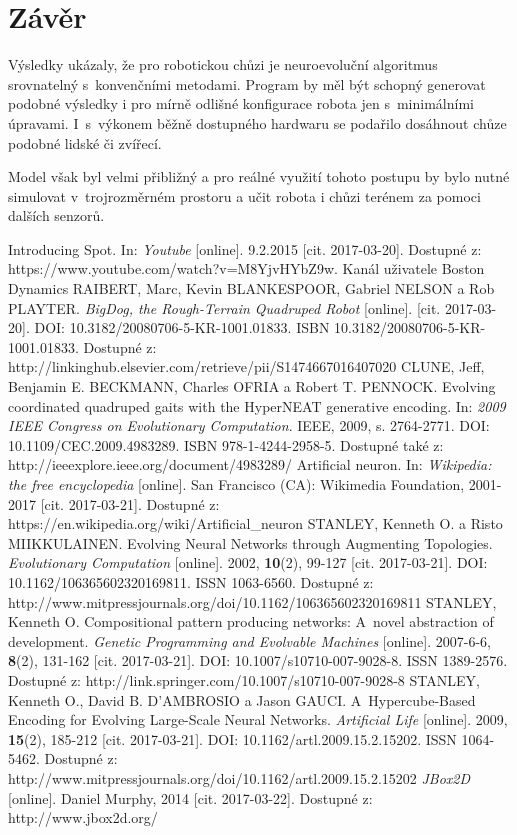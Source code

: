 \documentclass[a4]{article}
\begin{document}
\section{Závěr} 
Výsledky ukázaly, že pro robotickou chůzi je neuroevoluční algoritmus srovnatelný s~konvenčními metodami. Program by měl být schopný generovat podobné výsledky i pro mírně odlišné konfigurace robota jen s~minimálními úpravami. I~s~výkonem běžně dostupného hardwaru se podařilo dosáhnout chůze podobné lidské či zvířecí. \par Model však byl velmi přibližný a pro reálné využití tohoto postupu by bylo nutné simulovat v~trojrozměrném prostoru a učit robota i chůzi terénem za pomoci dalších senzorů.
\begin{thebibliography}{8}
Introducing Spot. In: \textit{Youtube} [online]. 9.2.2015 [cit. 2017-03-20]. Dostupné z: https://www.youtube.com/watch?v=M8YjvHYbZ9w. Kanál uživatele Boston Dynamics
RAIBERT, Marc, Kevin BLANKESPOOR, Gabriel NELSON a Rob PLAYTER. \textit{BigDog, the Rough-Terrain Quadruped Robot} [online]. [cit. 2017-03-20]. DOI: 10.3182/20080706-5-KR-1001.01833. ISBN 10.3182/20080706-5-KR-1001.01833. Dostupné z: http://linkinghub.elsevier.com/retrieve/pii/S1474667016407020
CLUNE, Jeff, Benjamin E. BECKMANN, Charles OFRIA a Robert T. PENNOCK. Evolving coordinated quadruped gaits with the HyperNEAT generative encoding. In: \textit{2009 IEEE Congress on Evolutionary Computation}. IEEE, 2009, s. 2764-2771. DOI: 10.1109/CEC.2009.4983289. ISBN 978-1-4244-2958-5. Dostupné také z: http://ieeexplore.ieee.org/document/4983289/
Artificial neuron. In: \textit{Wikipedia: the free encyclopedia} [online]. San Francisco (CA): Wikimedia Foundation, 2001-2017 [cit. 2017-03-21]. Dostupné z: https://en.wikipedia.org/wiki/Artificial\_neuron
STANLEY, Kenneth O. a Risto MIIKKULAINEN. Evolving Neural Networks through Augmenting Topologies. \emph{Evolutionary Computation} [online]. 2002, \textbf{10}(2), 99-127 [cit. 2017-03-21]. DOI: 10.1162/106365602320169811. ISSN 1063-6560. Dostupné z: http://www.mitpressjournals.org/doi/10.1162/106365602320169811
STANLEY, Kenneth O. Compositional pattern producing networks: A~novel abstraction of development. \emph{Genetic Programming and Evolvable Machines} [online]. 2007-6-6, \textbf{8}(2), 131-162 [cit. 2017-03-21]. DOI: 10.1007/s10710-007-9028-8. ISSN 1389-2576. Dostupné z: http://link.springer.com/10.1007/s10710-007-9028-8
STANLEY, Kenneth O., David B. D'AMBROSIO a Jason GAUCI. A~Hypercube-Based Encoding for Evolving Large-Scale Neural Networks. \textit{Artificial Life} [online]. 2009, \textbf{15}(2), 185-212 [cit. 2017-03-21]. DOI: 10.1162/artl.2009.15.2.15202. ISSN 1064-5462. Dostupné z: http://www.mitpressjournals.org/doi/10.1162/artl.2009.15.2.15202
\textit{JBox2D} [online]. Daniel Murphy, 2014 [cit. 2017-03-22]. Dostupné z: http://www.jbox2d.org/
\end{thebibliography}
\end{document}
